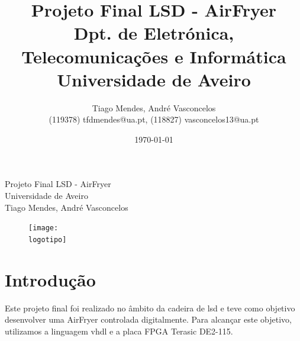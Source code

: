 \documentclass[a4paper, 11pt, onecolumn, oneside]{report}
\begin{document}
%
\def\titulo{Projeto Final LSD - AirFryer}
\def\data{DATA}
\def\autores{Tiago Mendes, André Vasconcelos}
\def\autorescontactos{(119378) tfdmendes@ua.pt, (118827) vasconcelos13@ua.pt}
\def\departamento{Dpt. de Eletrónica, Telecomunicações e Informática}
\def\empresa{Universidade de Aveiro}
\def\logotipo{ua.pdf}
%
%
\begin{titlepage}

\begin{center}
%
\vspace*{50mm}
%
{\Huge \titulo}\\ 
%
\vspace{10mm}
%
{\Large \empresa}\\
%
\vspace{10mm}
%
{\LARGE \autores}\\ 
%
\vspace{30mm}
%
\begin{figure}[h]
\center
\texttt{[image: \\logotipo]}
\end{figure}
%
\vspace{30mm}
\end{center}
%
\begin{flushright}
\end{flushright}
\end{titlepage}

\title{%
{\Huge\textbf{\titulo}}\\
{\Large \departamento\\ \empresa}
}
%
\author{%
    \autores \\
    \autorescontactos
}
%
\date{\today}
%
\maketitle

\renewcommand{\contentsname}{Índice}
\tableofcontents
\listoftables

\listoffigures

\clearpage
{}
%
\chapter{Introdução}
\label{chap.introducao}
Este projeto final foi realizado no âmbito da cadeira de \ac{lsd} e teve como objetivo desenvolver uma AirFryer controlada digitalmente. Para alcançar este objetivo, utilizamos a linguagem \ac{vhdl} e a placa FPGA Terasic DE2-115.
\end{document}
